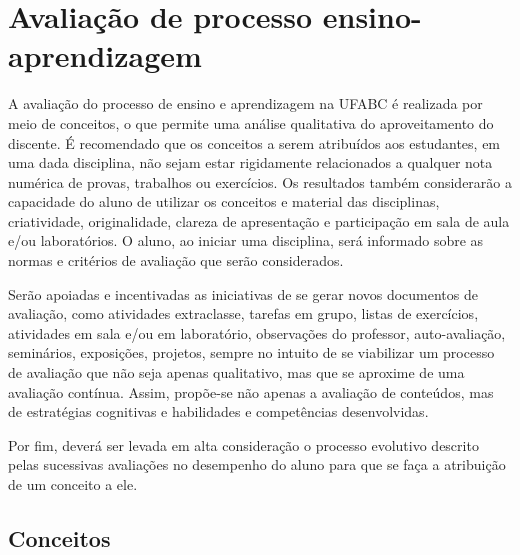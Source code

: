 \section{Avaliação de processo ensino-aprendizagem}
\label{sec:avaliacao_ensino_aprendizagem}

A avaliação do processo de ensino e aprendizagem na UFABC é realizada por meio
de conceitos, o que permite uma análise qualitativa do aproveitamento do discente.
É recomendado que os conceitos a serem atribuídos aos estudantes, em
uma dada disciplina, não sejam estar rigidamente relacionados a
qualquer nota numérica de provas, trabalhos ou exercícios.  Os
resultados também considerarão a capacidade do aluno de utilizar os
conceitos e material das disciplinas, criatividade, originalidade,
clareza de apresentação e participação em sala de aula e/ou
laboratórios.  O aluno, ao iniciar uma disciplina, será informado
sobre as normas e critérios de avaliação que serão considerados.

Serão apoiadas e incentivadas as iniciativas de se gerar novos documentos de
avaliação, como atividades extraclasse, tarefas em grupo, listas de exercícios,
atividades em sala e/ou em laboratório, observações do professor,
auto-avaliação, seminários, exposições, projetos, sempre no intuito de se
viabilizar um processo de avaliação que não seja apenas qualitativo, mas que se
aproxime de uma avaliação contínua.
Assim, propõe-se não apenas a avaliação de conteúdos, mas de estratégias
cognitivas e habilidades e competências desenvolvidas. 

Por fim, deverá ser levada em alta consideração o processo evolutivo descrito
pelas sucessivas avaliações no desempenho do aluno para que se faça a
atribuição de um conceito a ele.

\subsection{Conceitos}

